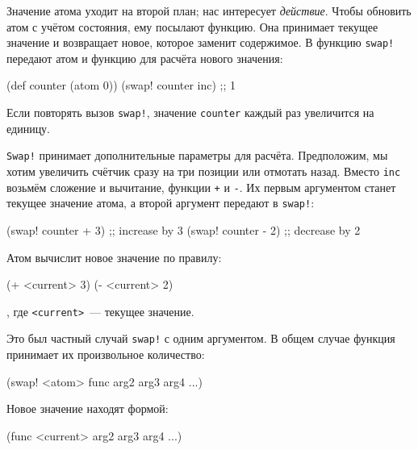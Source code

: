 Значение атома уходит на второй план; нас интересует \emph{действие}. Чтобы
обновить атом с учётом состояния, ему посылают функцию. Она принимает текущее
значение и возвращает новое, которое заменит содержимое. В функцию
\verb|swap!| передают атом и функцию для расчёта нового значения:


\begin{english}
  \begin{clojure}
(def counter (atom 0))
(swap! counter inc) ;; 1
  \end{clojure}
\end{english}

\noindent
Если повторять вызов \verb|swap!|, значение \verb|counter| каждый раз
увеличится на единицу.

\verb|Swap!| принимает дополнительные параметры для расчёта. Предположим, мы
хотим увеличить счётчик сразу на три позиции или отмотать назад. Вместо
\verb|inc| возьмём сложение и вычитание, функции \verb|+| и \verb|-|. Их
первым аргументом станет текущее значение атома, а второй аргумент передают в
\verb|swap!|:

\begin{english}
  \begin{clojure}
(swap! counter + 3) ;; increase by 3
(swap! counter - 2) ;; decrease by 2
  \end{clojure}
\end{english}

\noindent
Атом вычислит новое значение по правилу:

\begin{english}
  \begin{clojure}
(+ <current> 3)
(- <current> 2)
  \end{clojure}
\end{english}

\noindent
, где \verb|<current>|~--- текущее значение.

Это был частный случай \verb|swap!| с одним аргументом. В общем случае функция
принимает их произвольное количество:

\begin{english}
  \begin{clojure}
(swap! <atom> func arg2 arg3 arg4 ...)
  \end{clojure}
\end{english}

\noindent
Новое значение находят формой:

\begin{english}
  \begin{clojure}
(func <current> arg2 arg3 arg4 ...)
  \end{clojure}
\end{english}

